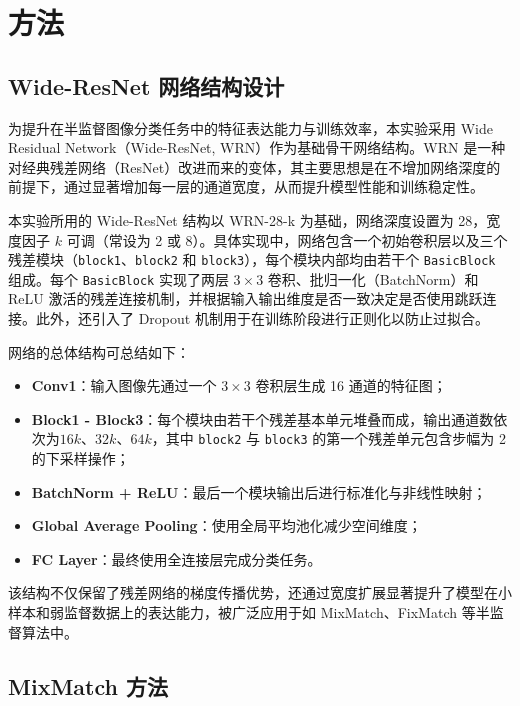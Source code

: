 \documentclass[a4paper, utf8]{ctexart}
\begin{document}
	\section{方法}
	
	\subsection{Wide-ResNet 网络结构设计}
	
	为提升在半监督图像分类任务中的特征表达能力与训练效率，本实验采用 Wide Residual Network（Wide-ResNet, WRN）作为基础骨干网络结构。WRN 是一种对经典残差网络（ResNet）改进而来的变体，其主要思想是在不增加网络深度的前提下，通过显著增加每一层的通道宽度，从而提升模型性能和训练稳定性\cite{wrn}。
	
	本实验所用的 Wide-ResNet 结构以 WRN-28-k 为基础，网络深度设置为 28，宽度因子 $k$ 可调（常设为 2 或 8）。具体实现中，网络包含一个初始卷积层以及三个残差模块（\verb|block1|、\verb|block2| 和 \verb|block3|），每个模块内部均由若干个 \verb|BasicBlock| 组成。每个 \verb|BasicBlock| 实现了两层 $3\times3$ 卷积、批归一化（BatchNorm）和 ReLU 激活的残差连接机制，并根据输入输出维度是否一致决定是否使用跳跃连接。此外，还引入了 Dropout 机制用于在训练阶段进行正则化以防止过拟合。
	
	网络的总体结构可总结如下：
	
	\begin{itemize}[itemsep=0pt, topsep=2pt, parsep=2pt]
		\item \textbf{Conv1}：输入图像先通过一个 $3\times3$ 卷积层生成 16 通道的特征图；
		\item \textbf{Block1 - Block3}：每个模块由若干个残差基本单元堆叠而成，输出通道数依次为$16k$、$32k$、$64k$，其中 \verb|block2| 与 \verb|block3| 的第一个残差单元包含步幅为 2 的下采样操作；
		\item \textbf{BatchNorm + ReLU}：最后一个模块输出后进行标准化与非线性映射；
		\item \textbf{Global Average Pooling}：使用全局平均池化减少空间维度；
		\item \textbf{FC Layer}：最终使用全连接层完成分类任务。
	\end{itemize}
	
	该结构不仅保留了残差网络的梯度传播优势，还通过宽度扩展显著提升了模型在小样本和弱监督数据上的表达能力，被广泛应用于如 MixMatch、FixMatch 等半监督算法中\cite{mixmatch}。
	
	\subsection{MixMatch 方法}
	
\end{document}
